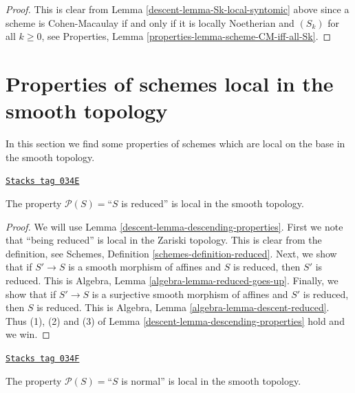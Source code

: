 \begin{proof}

This is clear from Lemma \ref{descent-lemma-Sk-local-syntomic}
above since a scheme is Cohen-Macaulay if and only if
it is locally Noetherian and $(S_k)$ for all $k \geq 0$, see
Properties, Lemma \ref{properties-lemma-scheme-CM-iff-all-Sk}.
\end{proof}

\section{Properties of schemes local in the smooth topology}
\label{descent-section-descending-properties-smooth}
In this section we find some properties of schemes which are local on the base
in the smooth topology.

\begin{lemma}
\label{descent-lemma-reduced-local-smooth}
\href{https://stacks.math.columbia.edu/tag/034E}{\texttt{Stacks tag 034E}}

The property $\mathcal{P}(S) =$``$S$ is reduced'' is local in the smooth
topology.
\end{lemma}

\begin{proof}

We will use Lemma \ref{descent-lemma-descending-properties}.
First we note that ``being reduced'' is local
in the Zariski topology. This is clear from the definition,
see Schemes, Definition \ref{schemes-definition-reduced}.
Next, we show that if $S' \to S$ is a smooth morphism of affines
and $S$ is reduced, then $S'$ is reduced. This is
Algebra, Lemma \ref{algebra-lemma-reduced-goes-up}.
Finally, we show that if $S' \to S$ is a surjective
smooth morphism of affines
and $S'$ is reduced, then $S$ is reduced. This is
Algebra, Lemma \ref{algebra-lemma-descent-reduced}.
Thus (1), (2) and (3) of Lemma \ref{descent-lemma-descending-properties} hold
and we win.
\end{proof}

\begin{lemma}
\label{descent-lemma-normal-local-smooth}
\href{https://stacks.math.columbia.edu/tag/034F}{\texttt{Stacks tag 034F}}


The property $\mathcal{P}(S) =$``$S$ is normal'' is local in the smooth
topology.
\end{lemma}

